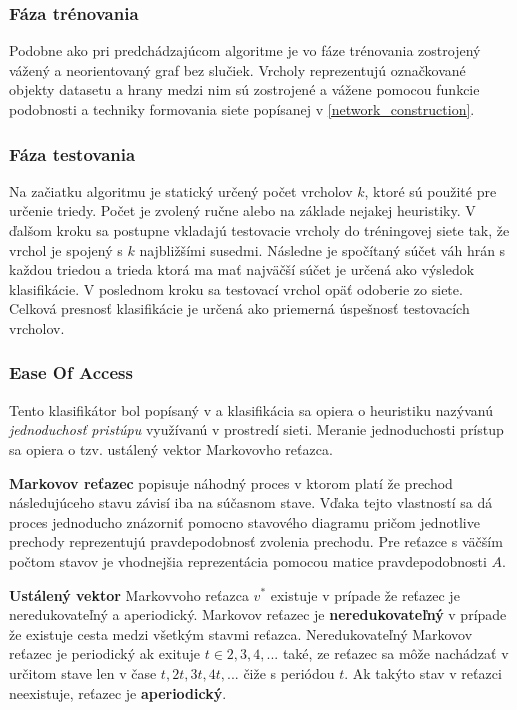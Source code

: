 \documentclass[slovak,master,dept460,male,cpp,cpdeclaration]{diploma}
\begin{document}
\subsubsection{Fáza trénovania}
Podobne ako pri predchádzajúcom algoritme je vo fáze trénovania zostrojený vážený a neorientovaný graf bez slučiek. Vrcholy reprezentujú označkované objekty datasetu a hrany medzi nim sú zostrojené a vážene pomocou funkcie podobnosti a techniky formovania siete popísanej v \ref{network_construction}.

\subsubsection{Fáza testovania}
Na začiatku algoritmu je statický určený počet vrcholov $k$, ktoré sú použité pre určenie triedy. Počet je zvolený ručne alebo na základe nejakej heuristiky.  V ďalšom kroku sa postupne vkladajú testovacie vrcholy do tréningovej siete tak, že vrchol je spojený s $k$ najbližšími susedmi. Následne je spočítaný súčet váh hrán s každou triedou a trieda ktorá ma mať najväčší súčet je určená ako výsledok klasifikácie. V poslednom kroku sa testovací vrchol opäť odoberie zo siete. Celková presnosť klasifikácie je určená ako priemerná úspešnosť testovacích vrcholov.

\subsubsection{Ease Of Access}
Tento klasifikátor bol popísaný v \cite{easeofaccess} a klasifikácia sa opiera o heuristiku nazývanú \textit{jednoduchosť pristúpu} využívanú v prostredí sieti. Meranie jednoduchosti prístup sa opiera o tzv. ustálený vektor Markovovho reťazca. 

\textbf{Markovov reťazec} popisuje náhodný proces v ktorom platí že prechod následujúceho stavu závisí iba na súčasnom stave. Vďaka tejto vlastností sa dá proces jednoducho znázorniť pomocno stavového diagramu pričom jednotlive prechody reprezentujú pravdepodobnosť zvolenia prechodu. Pre reťazce s väčším počtom stavov je vhodnejšia reprezentácia pomocou matice pravdepodobnosti $A$.

\textbf{Ustálený vektor} Markovvoho reťazca $v^*$ existuje v prípade že reťazec je neredukovateľný a aperiodický.
Markovov reťazec je \textbf{neredukovateľný} v prípade že existuje cesta medzi všetkým stavmi reťazca.
Neredukovateľný Markovov reťazec je periodický ak exituje $t \in {2,3,4,...} $   také, ze reťazec sa môže nachádzať v určitom stave len v čase ${t, 2t, 3t, 4t, . . .}$ čiže s periódou $t$. Ak takýto stav v reťazci neexistuje, reťazec je \textbf{aperiodický}. 
\end{document}
